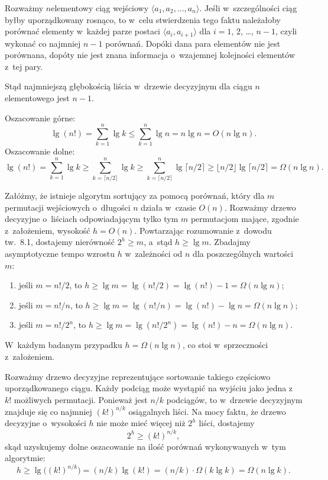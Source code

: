 
\exercise %
Rozważmy $n$\nbhyphen elementowy ciąg wejściowy $\langle a_1,a_2,\dots,a_n\rangle$.
Jeśli w~szczególności ciąg byłby uporządkowany rosnąco, to w~celu stwierdzenia tego faktu należałoby porównać elementy w~każdej parze postaci $\langle a_i,a_{i+1}\rangle$ dla $i=1$, 2, \dots, $n-1$, czyli wykonać co najmniej $n-1$ porównań.
Dopóki dana para elementów nie jest porównana, dopóty nie jest znana informacja o~wzajemnej kolejności elementów z~tej pary.

Stąd najmniejszą głębokością liścia w~drzewie decyzyjnym dla ciągu $n$\nbhyphen elementowego jest $n-1$.

\exercise %
Oszacowanie górne:
\[
	\lg(n!) = \sum_{k=1}^n\lg k \le \sum_{k=1}^n\lg n = n\lg n = O(n\lg n).
\]
Oszacowanie dolne:
\[
	\lg(n!) = \sum_{k=1}^n\lg k \ge \sum_{k=\lceil n/2\rceil}^n\lg k \ge \sum_{k=\lceil n/2\rceil}^n\lg\lceil n/2\rceil \ge \lfloor n/2\rfloor\lg\lceil n/2\rceil = \Omega(n\lg n).
\]

\exercise %
Załóżmy, że istnieje algorytm sortujący za pomocą porównań, który dla $m$ permutacji wejściowych o~długości $n$ działa w~czasie $O(n)$.
Rozważmy drzewo decyzyjne o~liściach odpowiadającym tylko tym $m$ permutacjom mające, zgodnie z~założeniem, wysokość $h=O(n)$.
Powtarzając rozumowanie z~dowodu tw.\ 8.1, dostajemy nierówność $2^h\ge m$, a~stąd $h\ge\lg m$.
Zbadajmy asymptotyczne tempo wzrostu $h$ w~zależności od $n$ dla poszczególnych wartości $m$:
\begin{enumerate}
	\renewcommand{\labelenumi}{(\roman{enumi})}
	\item jeśli $m=n!/2$, to $h\ge\lg m=\lg(n!/2)=\lg(n!)-1=\Omega(n\lg n)$;
	\item jeśli $m=n!/n$, to $h\ge\lg m=\lg(n!/n)=\lg(n!)-\lg n=\Omega(n\lg n)$;
	\item jeśli $m=n!/2^n$, to $h\ge\lg m=\lg(n!/2^n)=\lg(n!)-n=\Omega(n\lg n)$.
\end{enumerate}
W~każdym badanym przypadku $h=\Omega(n\lg n)$, co stoi w~sprzeczności z~założeniem.

\exercise %
Rozważmy drzewo decyzyjne reprezentujące sortowanie takiego częściowo uporządkowanego ciągu.
Każdy podciąg może wystąpić na wyjściu jako jedna z~$k!$ możliwych permutacji.
Ponieważ jest $n/k$ podciągów, to w~drzewie decyzyjnym znajduje się co najmniej $(k!)^{n/k}$ osiągalnych liści.
Na mocy faktu, że drzewo decyzyjne o~wysokości $h$ nie może mieć więcej niż $2^h$ liści, dostajemy
\[
	2^h \ge (k!)^{n/k},
\]
skąd uzyskujemy dolne oszacowanie na ilość porównań wykonywanych w~tym algorytmie:
\[
	h \ge \lg\bigl((k!)^{n/k}\bigr) = (n/k)\lg(k!) = (n/k)\cdot\Omega(k\lg k) = \Omega(n\lg k).
\]
